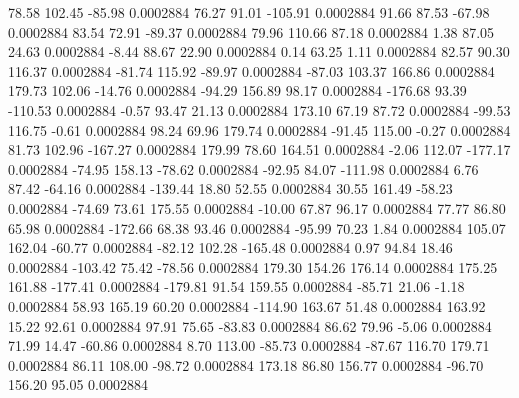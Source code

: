        78.58      102.45      -85.98     0.0002884
       76.27       91.01     -105.91     0.0002884
       91.66       87.53      -67.98     0.0002884
       83.54       72.91      -89.37     0.0002884
       79.96      110.66       87.18     0.0002884
        1.38       87.05       24.63     0.0002884
       -8.44       88.67       22.90     0.0002884
        0.14       63.25        1.11     0.0002884
       82.57       90.30      116.37     0.0002884
      -81.74      115.92      -89.97     0.0002884
      -87.03      103.37      166.86     0.0002884
      179.73      102.06      -14.76     0.0002884
      -94.29      156.89       98.17     0.0002884
     -176.68       93.39     -110.53     0.0002884
       -0.57       93.47       21.13     0.0002884
      173.10       67.19       87.72     0.0002884
      -99.53      116.75       -0.61     0.0002884
       98.24       69.96      179.74     0.0002884
      -91.45      115.00       -0.27     0.0002884
       81.73      102.96     -167.27     0.0002884
      179.99       78.60      164.51     0.0002884
       -2.06      112.07     -177.17     0.0002884
      -74.95      158.13      -78.62     0.0002884
      -92.95       84.07     -111.98     0.0002884
        6.76       87.42      -64.16     0.0002884
     -139.44       18.80       52.55     0.0002884
       30.55      161.49      -58.23     0.0002884
      -74.69       73.61      175.55     0.0002884
      -10.00       67.87       96.17     0.0002884
       77.77       86.80       65.98     0.0002884
     -172.66       68.38       93.46     0.0002884
      -95.99       70.23        1.84     0.0002884
      105.07      162.04      -60.77     0.0002884
      -82.12      102.28     -165.48     0.0002884
        0.97       94.84       18.46     0.0002884
     -103.42       75.42      -78.56     0.0002884
      179.30      154.26      176.14     0.0002884
      175.25      161.88     -177.41     0.0002884
     -179.81       91.54      159.55     0.0002884
      -85.71       21.06       -1.18     0.0002884
       58.93      165.19       60.20     0.0002884
     -114.90      163.67       51.48     0.0002884
      163.92       15.22       92.61     0.0002884
       97.91       75.65      -83.83     0.0002884
       86.62       79.96       -5.06     0.0002884
       71.99       14.47      -60.86     0.0002884
        8.70      113.00      -85.73     0.0002884
      -87.67      116.70      179.71     0.0002884
       86.11      108.00      -98.72     0.0002884
      173.18       86.80      156.77     0.0002884
      -96.70      156.20       95.05     0.0002884
